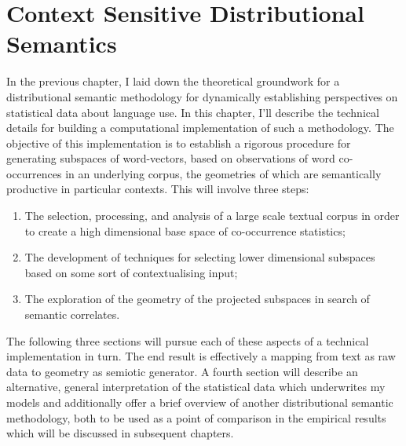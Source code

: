 \chapter{Context Sensitive Distributional Semantics} \label{chap:method}
In the previous chapter, I laid down the theoretical groundwork for a distributional semantic methodology for dynamically establishing perspectives on statistical data about language use.  In this chapter, I'll describe the technical details for building a computational implementation of such a methodology.  The objective of this implementation is to establish a rigorous procedure for generating subspaces of word-vectors, based on observations of word co-occurrences in an underlying corpus, the geometries of which are semantically productive in particular contexts.  This will involve three steps:

\begin{enumerate}
\item The selection, processing, and analysis of a large scale textual corpus in order to create a high dimensional base space of co-occurrence statistics;
\item The development of techniques for selecting lower dimensional subspaces based on some sort of contextualising input;
\item The exploration of the geometry of the projected subspaces in search of semantic correlates.
\end{enumerate}

The following three sections will pursue each of these aspects of a technical implementation in turn.  The end result is effectively a mapping from text as raw data to geometry as semiotic generator.  A fourth section will describe an alternative, general interpretation of the statistical data which underwrites my models and additionally offer a brief overview of another distributional semantic methodology, both to be used as a point of comparison in the empirical results which will be discussed in subsequent chapters.

